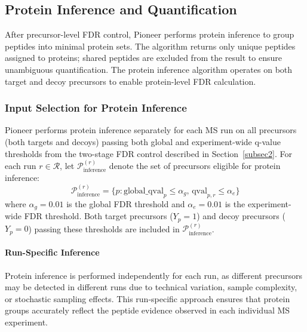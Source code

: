 \documentclass{article}
\begin{document}
\subsection{Protein Inference and Quantification}\label{subsec:protein_inference}

After precursor-level FDR control, Pioneer performs protein inference to group peptides into minimal protein sets. The algorithm returns only unique peptides assigned to proteins; shared peptides are excluded from the result to ensure unambiguous quantification. The protein inference algorithm operates on both target and decoy precursors to enable protein-level FDR calculation.

\subsubsection{Input Selection for Protein Inference}

Pioneer performs protein inference separately for each MS run on all precursors (both targets and decoys) passing both global and experiment-wide q-value thresholds from the two-stage FDR control described in Section~\ref{subsec2}. For each run $r \in \mathcal{R}$, let $\mathcal{P}_{\text{inference}}^{(r)}$ denote the set of precursors eligible for protein inference:
\begin{equation}
\mathcal{P}_{\text{inference}}^{(r)} = \{p : \text{global\_qval}_p \leq \alpha_g, \, \text{qval}_{p,r} \leq \alpha_e\}
\end{equation}
where $\alpha_g = 0.01$ is the global FDR threshold and $\alpha_e = 0.01$ is the experiment-wide FDR threshold. Both target precursors ($Y_p = 1$) and decoy precursors ($Y_p = 0$) passing these thresholds are included in $\mathcal{P}_{\text{inference}}^{(r)}$.

\paragraph{Run-Specific Inference} Protein inference is performed independently for each run, as different precursors may be detected in different runs due to technical variation, sample complexity, or stochastic sampling effects. This run-specific approach ensures that protein groups accurately reflect the peptide evidence observed in each individual MS experiment.
\end{document}
